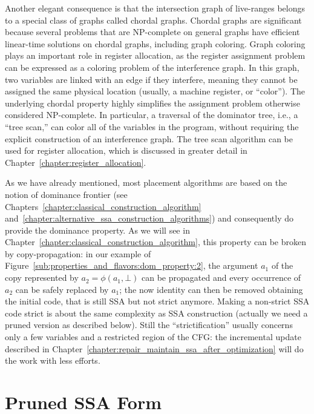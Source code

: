 Another elegant consequence is that the intersection graph of live-ranges belongs to a special class of graphs called chordal graphs. 
Chordal graphs are significant because several problems that are NP-complete on general graphs have efficient linear-time solutions on chordal graphs, including graph coloring. 
Graph coloring plays an important role in register allocation, as the register assignment problem can be expressed as a coloring problem of the interference graph. 
In this graph, two variables are linked with an edge if they interfere, meaning they cannot be assigned the same physical location (usually, a machine register, or ``color''). 
The underlying chordal property highly simplifies the assignment problem otherwise considered NP-complete. 
In particular, a traversal of the dominator tree, i.e., a ``tree scan,'' can color all of the variables in the program, without requiring the explicit construction of an interference graph. 
The tree scan algorithm can be used for register allocation, which is discussed in greater detail in Chapter~\ref{chapter:register_allocation}.

As we have already mentioned, most \phifun placement algorithms are based on the notion of dominance frontier (see Chapters~\ref{chapter:classical_construction_algorithm} and~\ref{chapter:alternative_ssa_construction_algorithms}) and consequently do provide the dominance property. 
As we will see in Chapter~\ref{chapter:classical_construction_algorithm}, this property can be broken by copy-propagation: 
in our example of Figure~\ref{sub:properties_and_flavors:dom_property:2}, the argument $a_1$ of the copy represented by $a_2=\phi(a_1,\bot)$ can be propagated and every occurrence of $a_2$ can be safely replaced by $a_1$; 
the now identity \phifun can then be removed obtaining the initial code, that is still SSA but not strict anymore. 
Making a non-strict SSA code strict is about the same complexity as SSA construction (actually we need a pruned version as described below). 
Still the ``strictification'' usually concerns only a few variables and a restricted region of the CFG: 
the incremental update described in Chapter~\ref{chapter:repair_maintain_ssa_after_optimization} will do the work with less efforts.

\section{Pruned SSA Form}
\label{sec-prop-pruned}

